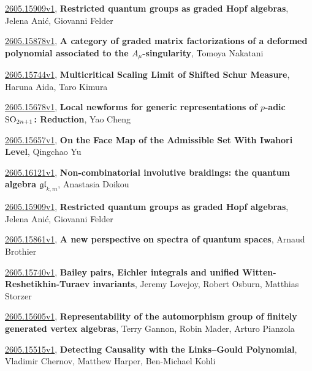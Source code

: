 \documentclass[9pt, a4paper]{article}
\theoremstyle{plain}
\theoremstyle{definition}
\theoremstyle{remark}
\newcommand{\arxiv}[3]{\href{https://arxiv.org/abs/#1}{#1}, \textbf{\textcolor{arxivblue}{#2}}, #3}
\begin{document}
\arxiv{2605.15909v1}{Restricted quantum groups as graded Hopf algebras}{Jelena Anić, Giovanni Felder}

\arxiv{2605.15878v1}{A category of graded matrix factorizations of a deformed polynomial associated to the $A_μ$-singularity}{Tomoya Nakatani}

\arxiv{2605.15744v1}{Multicritical Scaling Limit of Shifted Schur Measure}{Haruna Aida, Taro Kimura}

\arxiv{2605.15678v1}{Local newforms for generic representations of $p$-adic ${\rm SO}_{2n+1}$: Reduction}{Yao Cheng}

\arxiv{2605.15657v1}{On the Face Map of the Admissible Set With Iwahori Level}{Qingchao Yu}

\arxiv{2605.16121v1}{Non-combinatorial involutive braidings: the quantum algebra $\mathfrak{gl}_{k,m}$}{Anastasia Doikou}

\arxiv{2605.15909v1}{Restricted quantum groups as graded Hopf algebras}{Jelena Anić, Giovanni Felder}

\arxiv{2605.15861v1}{A new perspective on spectra of quantum spaces}{Arnaud Brothier}

\arxiv{2605.15740v1}{Bailey pairs, Eichler integrals and unified Witten-Reshetikhin-Turaev invariants}{Jeremy Lovejoy, Robert Osburn, Matthias Storzer}

\arxiv{2605.15605v1}{Representability of the automorphism group of finitely generated vertex algebras}{Terry Gannon, Robin Mader, Arturo Pianzola}

\arxiv{2605.15515v1}{Detecting Causality with the Links--Gould Polynomial}{Vladimir Chernov, Matthew Harper, Ben-Michael Kohli}

\end{document}
